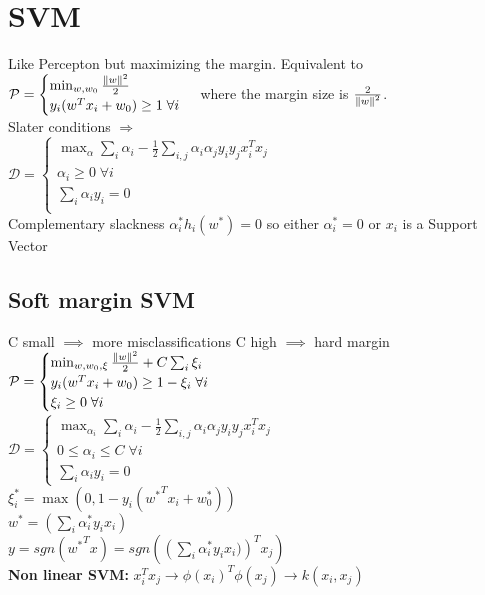 \section{SVM} 
Like Percepton but maximizing the margin. Equivalent to\\
\(\mathcal{P} =
\begin{cases}
	\min_{w,w_0} \frac{\left\lVert w\right\rVert^2}{2}\\
	y_i(w^Tx_i +  w_0)\geq 1 \;\forall i\\
\end{cases}
\)
where the margin size is \(\frac{2}{\left\lVert w\right\rVert^2}\).\\
Slater conditions $\Rightarrow$ \\
\(\mathcal{D} =
	\begin{cases}
		\max_{\alpha} \sum_i \alpha_i - \frac{1}{2}\sum_{i,j}\alpha_i\alpha_jy_iy_jx_i^Tx_j\\
		\alpha_i\geq 0 \;\forall i\\
	    \sum_i \alpha_i y_i = 0\\
	\end{cases}
		\)\\
Complementary slackness \(\alpha_i^*h_i(w^*)=0\) so either \(\alpha^*_i = 0\)  or \(x_i\) is a Support Vector
\subsection*{Soft margin SVM}
C small $\implies$ more misclassifications
C high $\implies$ hard margin\\
\(\mathcal{P} =
\begin{cases}
	\min_{w,w_0, \xi} \frac{\left\lVert w\right\rVert^2}{2} + C\sum_i\xi_i\\
	y_i(w^Tx_i +  w_0)\geq 1 -\xi_i\;\forall i\\
	\xi_i\geq 0\;\forall i\\
\end{cases}
\)\\
\(\mathcal{D} =
\begin{cases}
	\max_{\alpha_i}\sum_i \alpha_i - \frac{1}{2}\sum_{i,j}\alpha_i\alpha_jy_iy_jx_i^Tx_j\\
	0\leq \alpha_i\leq C \;\forall i\\
	\sum_i \alpha_i y_i = 0
\end{cases}
\)\\
\(\xi_i^{*} = \max(0,1-y_i({w^*}^Tx_i + w_0^*))\)\\
$w^* = (\sum_i\alpha_i^*y_ix_i)$\\
$y = sgn\left({w^*}^Tx\right) = sgn\left(\left(\sum_i\alpha_i^*y_ix_i)\right)^Tx_j \right)$\\
\textbf{Non linear SVM: }$x_i^Tx_j \rightarrow \phi(x_i)^T\phi(x_j) \rightarrow k(x_i,x_j)$%
